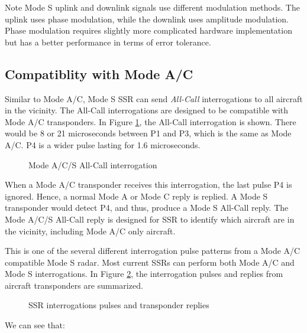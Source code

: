 \begin{notebox}{Note}
  Mode S uplink and downlink signals use different modulation methods. The uplink uses phase modulation, while the downlink uses amplitude modulation. Phase modulation requires slightly more complicated hardware implementation but has a better performance in terms of error tolerance. 
\end{notebox}

\subsection{Compatiblity with Mode A/C}

Similar to Mode A/C, Mode S SSR can send \emph{All-Call} interrogations to all aircraft in the vicinity. The All-Call interrogations are designed to be compatible with Mode A/C transponders. In Figure \ref{fig:mode_s_all_call}, the All-Call interrogation is shown. There would be 8 or 21 microseconds between P1 and P3, which is the same as Mode A/C. P4 is a wider pulse lasting for 1.6 microseconds.

\begin{figure}[ht]
  \scalebox{0.9}{
    
  }
  \caption{Mode A/C/S All-Call interrogation}
  \label{fig:mode_s_all_call}
\end{figure}

When a Mode A/C transponder receives this interrogation, the last pulse P4 is ignored. Hence, a normal Mode A or Mode C reply is replied. A Mode S transponder would detect P4, and thus, produce a Mode S All-Call reply. The Mode A/C/S All-Call reply is designed for SSR to identify which aircraft are in the vicinity, including Mode A/C only aircraft.

This is one of the several different interrogation pulse patterns from a Mode A/C compatible Mode S radar. Most current SSRs can perform both Mode A/C and Mode S interrogations. In Figure \ref{fig:mode_s_inter_mode}, the interrogation pulses and replies from aircraft transponders are summarized.

\begin{figure}[ht]
  \scalebox{0.9}{
    
  }
  \caption{SSR interrogations pulses and transponder replies}
  \label{fig:mode_s_inter_mode}
\end{figure}

We can see that:

